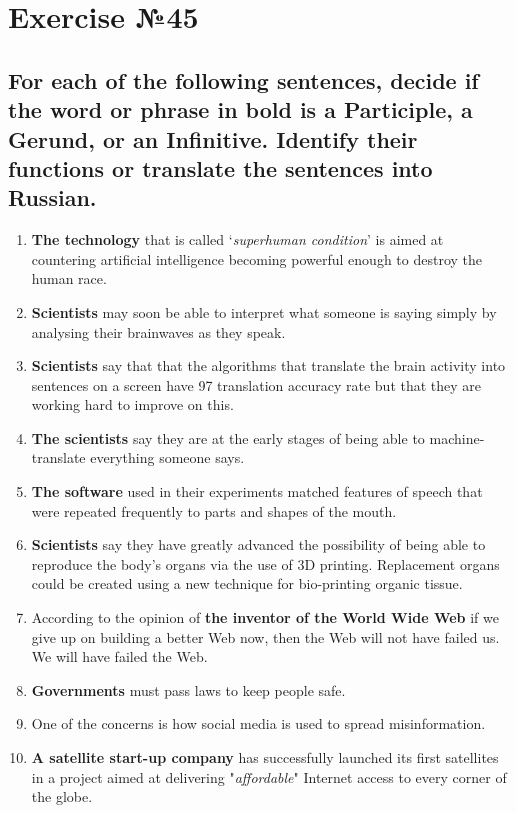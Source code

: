 \section{Exercise №45}
\subsection*{For each of the following sentences, decide if the word or phrase in bold is a Participle, a Gerund, or an Infinitive. Identify their functions or translate the sentences into Russian.}
\begin{enumerate}
      \item \textbf{The technology} that is called ‘\textit{superhuman condition}’ is aimed at countering artificial intelligence becoming powerful enough to destroy the human race.
      \item \textbf{Scientists} may soon be able to interpret what someone is saying simply by analysing their brainwaves as they speak.
      \item \textbf{Scientists} say that that the algorithms that translate the brain activity into sentences on a screen have 97 translation accuracy rate but that they are working hard to improve on this.
      \item \textbf{The scientists} say they are at the early stages of being able to machine-translate everything someone says.
      \item \textbf{The software} used in their experiments matched features of speech that were repeated frequently to parts and shapes of the mouth.
      \item \textbf{Scientists} say they have greatly advanced the possibility of being able to reproduce the body's organs via the use of 3D printing. Replacement organs could be created using a new technique for bio-printing organic tissue.
      \item According to the opinion of \textbf{the inventor of the World Wide Web} if we give up on building a better Web now, then the Web will not have failed us. We will have failed the Web.
      \item \textbf{Governments} must pass laws to keep people safe.
      \item One of the concerns is how social media is used to spread misinformation.
      \item \textbf{A satellite start-up company} has successfully launched its first satellites in a project aimed at delivering "\textit{affordable}" Internet access to every corner of the globe.
\end{enumerate}

